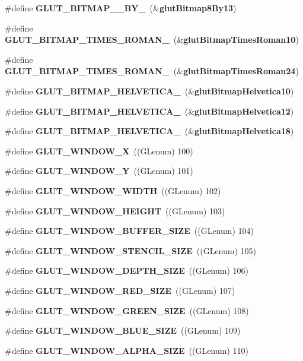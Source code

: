 \begin{DoxyCompactItemize}
\#define {\bf G\+L\+U\+T\+\_\+\+B\+I\+T\+M\+A\+P\+\_\+\_\+\+B\+Y\+\_}~(\&{\bf glut\+Bitmap8\+By13})
\item 
\#define {\bf G\+L\+U\+T\+\_\+\+B\+I\+T\+M\+A\+P\+\_\+\+T\+I\+M\+E\+S\+\_\+\+R\+O\+M\+A\+N\+\_}~(\&{\bf glut\+Bitmap\+Times\+Roman10})
\item 
\#define {\bf G\+L\+U\+T\+\_\+\+B\+I\+T\+M\+A\+P\+\_\+\+T\+I\+M\+E\+S\+\_\+\+R\+O\+M\+A\+N\+\_}~(\&{\bf glut\+Bitmap\+Times\+Roman24})
\item 
\#define {\bf G\+L\+U\+T\+\_\+\+B\+I\+T\+M\+A\+P\+\_\+\+H\+E\+L\+V\+E\+T\+I\+C\+A\+\_}~(\&{\bf glut\+Bitmap\+Helvetica10})
\item 
\#define {\bf G\+L\+U\+T\+\_\+\+B\+I\+T\+M\+A\+P\+\_\+\+H\+E\+L\+V\+E\+T\+I\+C\+A\+\_}~(\&{\bf glut\+Bitmap\+Helvetica12})
\item 
\#define {\bf G\+L\+U\+T\+\_\+\+B\+I\+T\+M\+A\+P\+\_\+\+H\+E\+L\+V\+E\+T\+I\+C\+A\+\_}~(\&{\bf glut\+Bitmap\+Helvetica18})
\item 
\#define {\bf G\+L\+U\+T\+\_\+\+W\+I\+N\+D\+O\+W\+\_\+X}~((G\+Lenum) 100)
\item 
\#define {\bf G\+L\+U\+T\+\_\+\+W\+I\+N\+D\+O\+W\+\_\+Y}~((G\+Lenum) 101)
\item 
\#define {\bf G\+L\+U\+T\+\_\+\+W\+I\+N\+D\+O\+W\+\_\+\+W\+I\+D\+TH}~((G\+Lenum) 102)
\item 
\#define {\bf G\+L\+U\+T\+\_\+\+W\+I\+N\+D\+O\+W\+\_\+\+H\+E\+I\+G\+HT}~((G\+Lenum) 103)
\item 
\#define {\bf G\+L\+U\+T\+\_\+\+W\+I\+N\+D\+O\+W\+\_\+\+B\+U\+F\+F\+E\+R\+\_\+\+S\+I\+ZE}~((G\+Lenum) 104)
\item 
\#define {\bf G\+L\+U\+T\+\_\+\+W\+I\+N\+D\+O\+W\+\_\+\+S\+T\+E\+N\+C\+I\+L\+\_\+\+S\+I\+ZE}~((G\+Lenum) 105)
\item 
\#define {\bf G\+L\+U\+T\+\_\+\+W\+I\+N\+D\+O\+W\+\_\+\+D\+E\+P\+T\+H\+\_\+\+S\+I\+ZE}~((G\+Lenum) 106)
\item 
\#define {\bf G\+L\+U\+T\+\_\+\+W\+I\+N\+D\+O\+W\+\_\+\+R\+E\+D\+\_\+\+S\+I\+ZE}~((G\+Lenum) 107)
\item 
\#define {\bf G\+L\+U\+T\+\_\+\+W\+I\+N\+D\+O\+W\+\_\+\+G\+R\+E\+E\+N\+\_\+\+S\+I\+ZE}~((G\+Lenum) 108)
\item 
\#define {\bf G\+L\+U\+T\+\_\+\+W\+I\+N\+D\+O\+W\+\_\+\+B\+L\+U\+E\+\_\+\+S\+I\+ZE}~((G\+Lenum) 109)
\item 
\#define {\bf G\+L\+U\+T\+\_\+\+W\+I\+N\+D\+O\+W\+\_\+\+A\+L\+P\+H\+A\+\_\+\+S\+I\+ZE}~((G\+Lenum) 110)
\item 

\end{DoxyCompactItemize}
